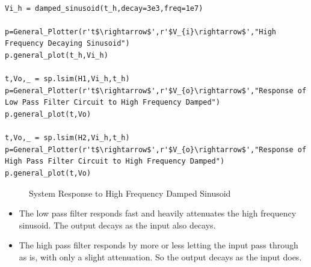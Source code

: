 \documentclass{article}
\begin{document}
\begin{lstlisting}

Vi_h = damped_sinusoid(t_h,decay=3e3,freq=1e7)

p=General_Plotter(r't$\rightarrow$',r'$V_{i}\rightarrow$',"High Frequency Decaying Sinusoid")
p.general_plot(t_h,Vi_h)

t,Vo,_ = sp.lsim(H1,Vi_h,t_h)
p=General_Plotter(r't$\rightarrow$',r'$V_{o}\rightarrow$',"Response of Low Pass Filter Circuit to High Frequency Damped")
p.general_plot(t,Vo)

t,Vo,_ = sp.lsim(H2,Vi_h,t_h)
p=General_Plotter(r't$\rightarrow$',r'$V_{o}\rightarrow$',"Response of High Pass Filter Circuit to High Frequency Damped")
p.general_plot(t,Vo)

\end{lstlisting}

\begin{figure}%
    \centering
    \qquad
    \caption{System Response to High Frequency Damped Sinusoid}%
    \label{Figure 6}
\end{figure}

\begin{itemize}
    \item
      The low pass filter responds fast and heavily attenuates the high
      frequency sinusoid. The output decays as the input also decays.
    \item
      The high pass filter responds by more or less letting the input pass
      through as is, with only a slight attenuation. So the output decays as
      the input does.
\end{itemize}
    
\end{document}
